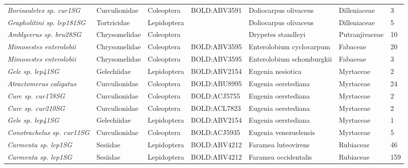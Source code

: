 \documentclass[11pt]{article}
\begin{document}
\begin{landscape}
\begin{longtable}{@{}lllllll@{}}
\textit{Borisauletes sp. cur1SG}                      & Curculionidae   & Coleoptera   & BOLD:ABV3591 & Doliocarpus olivaceus              & Dilleniaceae     & 3     \\
\textit{Grapholitini sp. lep181SG}                    & Tortricidae     & Lepidoptera  &              & Doliocarpus olivaceus              & Dilleniaceae     & 5     \\
\textit{Amblycerus sp. bru28SG}                       & Chrysomelidae   & Coleoptera   &              & Drypetes standleyi                 & Putranjivaceae   & 10    \\
\textit{Mimosestes enterolobii}                       & Chrysomelidae   & Coleoptera   & BOLD:ABV3595 & Enterolobium cyclocarpum           & Fabaceae         & 20    \\
\textit{Mimosestes enterolobii}                       & Chrysomelidae   & Coleoptera   & BOLD:ABV3595 & Enterolobium schomburgkii          & Fabaceae         & 3     \\
\textit{Gele sp. lep41SG}                             & Gelechiidae     & Lepidoptera  & BOLD:ABV2154 & Eugenia nesiotica                  & Myrtaceae        & 2     \\
\textit{Atractomerus caligatus}                       & Curculionidae   & Coleoptera   & BOLD:ABU8995 & Eugenia oerstediana                & Myrtaceae        & 24    \\
\textit{Curc sp. cur178SG}                            & Curculionidae   & Coleoptera   & BOLD:ACJ5755 & Eugenia oerstediana                & Myrtaceae        & 2     \\
\textit{Curc sp. cur210SG}                            & Curculionidae   & Coleoptera   & BOLD:ACL7823 & Eugenia oerstediana                & Myrtaceae        & 2     \\
\textit{Gele sp. lep41SG}                             & Gelechiidae     & Lepidoptera  & BOLD:ABV2154 & Eugenia oerstediana                & Myrtaceae        & 1     \\
\textit{Conotrachelus sp. cur11SG}                    & Curculionidae   & Coleoptera   & BOLD:ACJ5935 & Eugenia venezuelensis              & Myrtaceae        & 5     \\
\textit{Carmenta sp. lep1SG}                          & Sesiidae        & Lepidoptera  & BOLD:ABV4212 & Faramea luteovirens                & Rubiaceae        & 46    \\
\textit{Carmenta sp. lep1SG}                          & Sesiidae        & Lepidoptera  & BOLD:ABV4212 & Faramea occidentalis               & Rubiaceae        & 159   \\

\end{longtable}
\end{landscape}
\end{document}
